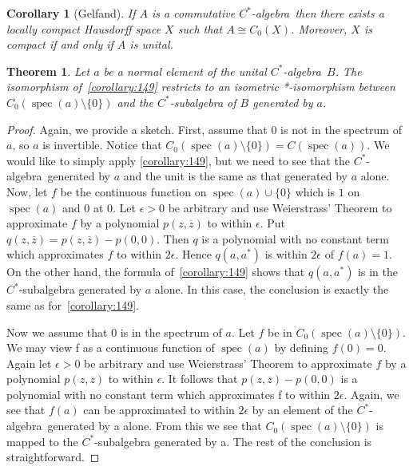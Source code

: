 \documentclass{book}
\newtheorem{theorem}[definition]{Theorem}
\newtheorem{corollary}[definition]{Corollary}
\def\cstar{\(C^*\)-algebra}
\begin{document}
\begin{corollary}[Gelfand]
  If \(A\) is a commutative \cstar\ then there exists a locally
  compact Hausdorff space \(X\) such that \(A \cong  C_0(X)\). Moreover, \(X\) is compact
  if and only if \(A\) is unital.
\end{corollary}
\begin{theorem}\label{theorem:184}
  Let \(a\) be a normal element of the unital \cstar\ \(B\).
  The isomorphism of~\ref{corollary:149} restricts to an isometric *-isomorphism between
  \(C_0(\operatorname{spec}(a) \setminus \{0\})\) and the \(C^*\)-subalgebra of \(B\) generated by \(a\).
\end{theorem}
\begin{proof}
  Again, we provide a sketch. First, assume that \(0\) is not in the spectrum
  of \(a\), so \(a\) is invertible. Notice that \(C_0(\operatorname{spec}(a)\setminus\{0\}) = C(\operatorname{spec}(a))\). We would
  like to simply apply \ref{corollary:149}, but we need to see that the \cstar\ generated
  by \(a\) and the unit is the same as that generated by \(a\) alone. Now, let \(f\) be
  the continuous function on \(\operatorname{spec}(a) \cup \{0\}\) which is \(1\) on \(\operatorname{spec}(a)\) and \(0\) at \(0\).
  Let \(\epsilon>0\) be arbitrary and use Weierstrass' Theorem to approximate \(f\) by a
  polynomial \(p(z, \overline{z})\) to within \(\epsilon\). Put
  \(q(z,\overline{z})=p(z,\overline{z})-p(0,0)\). Then \(q\) is a polynomial with no constant
  term which approximates \(f\) to within \(2\epsilon\). Hence \(q(a,a^*)\) is within
  \(2\epsilon\) of \(f(a)=1\). On the other hand, the formula of~\ref{corollary:149} shows
  that \(q(a,a^*)\) is in the \(C^*\)-subalgebra generated by \(a\) alone. In this case, the
  conclusion is exactly the same as for~\ref{corollary:149}.\par
  Now we assume that \(0\) is in the spectrum of \(a\). Let \(f\) be in \(C_0(\operatorname{spec}(a) \setminus \{0\})\). 
  We may view f as a continuous function of \(\operatorname{spec}(a)\) by defining \(f(0) = 0\).
  Again let \(\epsilon> 0\) be arbitrary and use Weierstrass' Theorem to approximate
  \(f\) by a polynomial \(p(z, \overline{z})\) to within \(\epsilon\). It follows that 
  \(p(z, \overline{z}) - p(0,0)\) is a
  polynomial with no constant term which approximates f to within \(2\epsilon\). Again,
  we see that \(f(a)\) can be approximated to within \(2\epsilon\) by an element of the \cstar\ generated
  by a alone. From this we see that \(C_0(\operatorname{spec}(a) \setminus \{0\})\) is
  mapped to the \(C^*\)-subalgebra generated by a. The rest of the conclusion is
  straightforward.
\end{proof}
\end{document}
